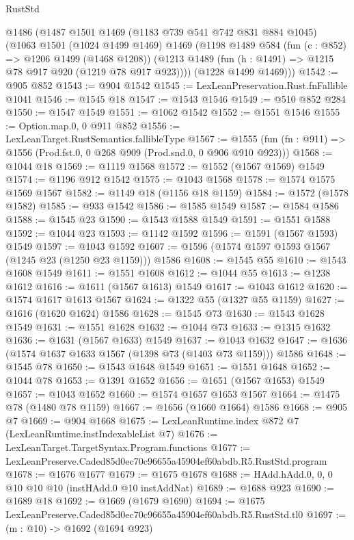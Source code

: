 \begin{lexlean}{RustStd}
\begin{coremodule}
  @1486
    (@1487
      @1501
      @1469
      (@1183 @739 @541 @742 @831 @884 @1045)
      (@1063
        @1501
        (@1024 @1499 @1469)
        @1469
        (@1198
          @1489
          @584
          (fun (c : @852) => @1206 @1499 (@1468 @1208))
          (@1213 @1489 (fun (h : @1491) => @1215 @78 @917 @920 (@1219 @78 @917 @923))))
        (@1228 @1499 @1469)))
@1542 := @905 @852
@1543 := @904 @1542
@1545 := LexLeanPreservation.Rust.fnFallible @1041
@1546 := @1545 @18
@1547 := @1543 @1546
@1549 := @510 @852 @284
@1550 := @1547 @1549
@1551 := @1062 @1542
@1552 := @1551 @1546
@1555 := Option.map.{0, 0} @911 @852
@1556 := LexLeanTarget.RustSemantics.fallibleType
@1567 := @1555
    (fun (fn : @911) => @1556 (Prod.fst.{0, 0} @268 @909 (Prod.snd.{0, 0} @906 @910 @923)))
@1568 := @1044 @18
@1569 := @1119 @1568
@1572 := @1552 (@1567 @1569) @1549
@1574 := @1196 @912 @1542
@1575 := @1043 @1568
@1578 := @1574 @1575 @1569 @1567
@1582 := @1149 @18 (@1156 @18 @1159)
@1584 := @1572 (@1578 @1582)
@1585 := @933 @1542
@1586 := @1585 @1549
@1587 := @1584 @1586
@1588 := @1545 @23
@1590 := @1543 @1588 @1549
@1591 := @1551 @1588
@1592 := @1044 @23
@1593 := @1142 @1592
@1596 := @1591 (@1567 @1593) @1549
@1597 := @1043 @1592
@1607 := @1596 (@1574 @1597 @1593 @1567 (@1245 @23 (@1250 @23 @1159))) @1586
@1608 := @1545 @55
@1610 := @1543 @1608 @1549
@1611 := @1551 @1608
@1612 := @1044 @55
@1613 := @1238 @1612
@1616 := @1611 (@1567 @1613) @1549
@1617 := @1043 @1612
@1620 := @1574 @1617 @1613 @1567
@1624 := @1322 @55 (@1327 @55 @1159)
@1627 := @1616 (@1620 @1624) @1586
@1628 := @1545 @73
@1630 := @1543 @1628 @1549
@1631 := @1551 @1628
@1632 := @1044 @73
@1633 := @1315 @1632
@1636 := @1631 (@1567 @1633) @1549
@1637 := @1043 @1632
@1647 := @1636 (@1574 @1637 @1633 @1567 (@1398 @73 (@1403 @73 @1159))) @1586
@1648 := @1545 @78
@1650 := @1543 @1648 @1549
@1651 := @1551 @1648
@1652 := @1044 @78
@1653 := @1391 @1652
@1656 := @1651 (@1567 @1653) @1549
@1657 := @1043 @1652
@1660 := @1574 @1657 @1653 @1567
@1664 := @1475 @78 (@1480 @78 @1159)
@1667 := @1656 (@1660 @1664) @1586
@1668 := @905 @7
@1669 := @904 @1668
@1675 := LexLeanRuntime.index @872 @7 (LexLeanRuntime.instIndexableList @7)
@1676 := LexLeanTarget.TargetSyntax.Program.functions
@1677 := LexLeanPreserve.Caded85d0ec70c96655a45904ef60abdb.R5.RustStd.program
@1678 := @1676 @1677
@1679 := @1675 @1678
@1688 := HAdd.hAdd.{0, 0, 0} @10 @10 @10 (instHAdd.{0} @10 instAddNat)
@1689 := @1688 @923
@1690 := @1689 @18
@1692 := @1669 (@1679 @1690)
@1694 := @1675 LexLeanPreserve.Caded85d0ec70c96655a45904ef60abdb.R5.RustStd.tl0
@1697 := (m : @10) -> @1692 (@1694 @923)

\end{coremodule}
\end{lexlean}
